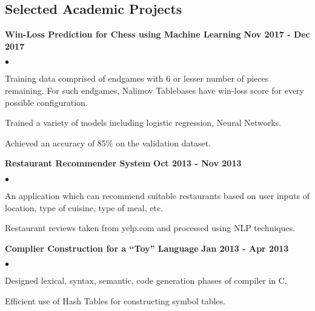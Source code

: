 \documentclass[margin,line]{res}
\newenvironment{list2}{
  \begin{list}{$\bullet$}{%
      \setlength{\itemsep}{0in}
      \setlength{\parsep}{0in} \setlength{\parskip}{0in}
      \setlength{\topsep}{0in} \setlength{\partopsep}{0in} 
      \setlength{\leftmargin}{0.2in}}}{\end{list}}
\begin{document}
\begin{resume}
\section{\sc Selected Academic Projects}

{\bf Win-Loss Prediction for Chess using Machine Learning} \hfill {\bf Nov 2017 - Dec 2017}\\

\vspace{-.3cm}
\begin{list2}
\item Training data comprised of endgames with 6 or lesser number of pieces remaining.
For such endgames, Nalimov Tablebases have win-loss score for every possible configuration.
\item Trained a variety of models including logistic regression, Neural Networks.
\item Achieved an accuracy of 85\% on the validation dataset.
\end{list2}

{\bf Restaurant Recommender System} \hfill {\bf Oct 2013 - Nov 2013}\\

\vspace{-.3cm}
\begin{list2}
\item An application which can recommend suitable restaurants based on user inputs of location, type of
cuisine, type of meal, etc.
\item Restaurant reviews taken from yelp.com and processed using NLP techniques.
\end{list2}

{\bf Complier Construction for a “Toy” Language} \hfill {\bf Jan 2013 - Apr 2013}\\

\vspace{-.3cm}
\begin{list2}
\item Designed lexical, syntax, semantic, code generation phases of compiler in C.
\item Efficient use of Hash Tables for constructing symbol tables.
\end{list2}

%





\end{resume}
\end{document}
